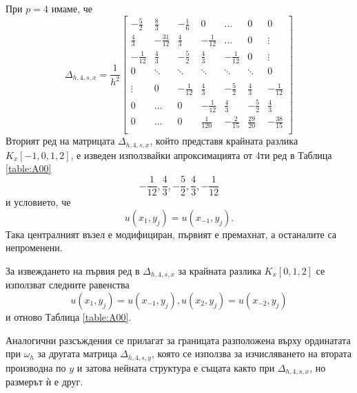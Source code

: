 \documentclass{article}
\theoremstyle{remark}
\begin{document}
При $p=4$ имаме, че 
\[
\Delta_{h,4,s,x} = \frac{1}{h^2}
\begin{bmatrix}
     -\frac{5}{2}	& \frac{8}{3}       & -\frac{1}{6}	&    0     			&    \dots      	   &   0           & 0    \\
    \frac{4}{3}          &-\frac{31}{12}    	& \frac{4}{3}	&   -\frac{1}{12}	  	&   \dots      	  &   0	           & \vdots  \\
    -\frac{1}{12}	& \frac{4}{3}         	& -\frac{5}{2}	&  \frac{4}{3}    	 &   -\frac{1}{12}	  &      0           &\vdots    \\
        0           		& \ddots        	&    \ddots   		 &   \ddots      	 &     \ddots      	  &  \ddots        &    0 \\	
\\
   \vdots      		 & 0           		 &  -\frac{1}{12}	& \frac{4}{3}    	& -\frac{5}{2}	&  \frac{4}{3}   &   -\frac{1}{12} \\
    0      		 &  \dots           	 &   0     		& -\frac{1}{12} 	 & \frac{4}{3} 	 & -\frac{5}{2}  &  \frac{4}{3}\\
    0              		 & \dots          	&  0              		 &\frac{1}{120} 	 &  -\frac{2}{15} 	& \frac{29}{20} & -\frac{38}{15}\\
\end{bmatrix}
\]
Вторият ред на матрицата $\Delta_{h,4,s,x}$, който представя крайната разлика $K_x[-1,0,1,2]$, е изведен използвайки апроксимацията от 4ти ред в Таблица \ref{table:A00}
$$ -\frac{1}{12}, \frac{4}{3}, -\frac{5}{2},  \frac{4}{3}, -\frac{1}{12} $$ и условието, че
$$u(x_1, y_j) = u(x_{-1}, y_j).$$
Така централният възел е модифициран, първият е премахнат, а останалите са непроменени. 

За извеждането на първия ред в $\Delta_{h,4,s,x}$ за крайната разлика $K_x[0,1,2]$ се използват следните равенства
$$u(x_1, y_j) = u(x_{-1}, y_j), u(x_2, y_j) = u(x_{-2}, y_j)$$
и отново Таблица \ref{table:A00}.

Аналогични разсъждения се прилагат за границата разположена върху ординатата при $\omega_h$ за другата матрица $\Delta_{h,4,s,y}$, която се използва за изчисляването на втората производна по $y$ и затова нейната структура е същата както при $\Delta_{h,4,s,x}$, но размерът ѝ е друг.
\end{document}
